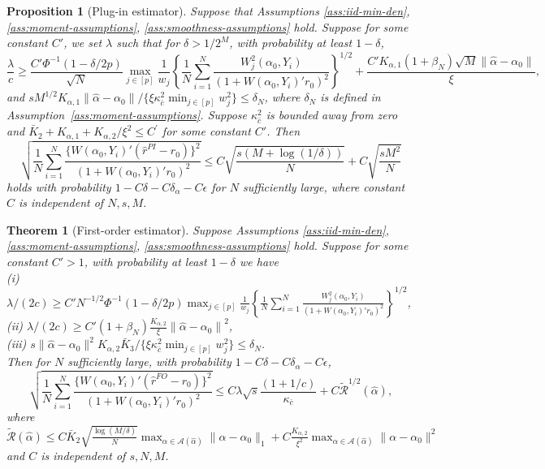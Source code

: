 \documentclass[10pt,a4paper]{amsart}
\newtheorem{proposition}{Proposition}
\newtheorem{theorem}{Theorem}
\newcommand{\norm}[1]{\left\lVert #1 \right\rVert}
\begin{document}
\begin{proposition}[Plug-in estimator]\label{prop:plug-in:no-covariate}
Suppose that Assumptions \ref{ass:iid-min-den}, \ref{ass:moment-assumptions}, \ref{ass:smoothness-assumptions} hold. Suppose for some constant $C'$, we set $\lambda$ such that for $\delta>1/2^M$, with probability at least $1-\delta$, 
$$\frac{\lambda}{c}\geq\frac{C'\Phi^{-1}(1-\delta/2p)}{\sqrt{N}}\max_{j\in[p]} \frac{1}{w_j}\left\{\frac{1}{N}\sum_{i=1}^N \frac{W_j^2(\alpha_0,Y_i)}{(1+W(\alpha_0,Y_i)'r_0)^2}\right\}^{1/2}\!\!\!\!+\frac{C'K_{\alpha,1}(1+\beta_N)\sqrt{M}\|\hat\alpha-\alpha_0\|}{\xi},$$
and $sM^{1/2}K_{\alpha,1}\|\hat\alpha-\alpha_0\|/ \{\xi\kappa_{\bar c}^2\min_{j\in[p]}w_j^2\}\leq \delta_N$, where $\delta_N$ is defined in Assumption~\ref{ass:moment-assumptions}. Suppose $\kappa_{\bar{c}}^2$ is bounded away from zero and $\bar K_2 + K_{\alpha,1} + K_{\alpha,2}/\xi^2 \leq C^\prime$ for some constant $C'$. Then $$\displaystyle\sqrt{\frac{1}{N}\sum_{i=1}^N \frac{\{W(\alpha_0,Y_i)'(\hat r^{PI} - r_0 )\}^2}{(1+W(\alpha_0,Y_i)'r_0)^2}}\leq C\sqrt{\frac{s(M+\log(1/\delta))}{N}} + C\sqrt{\frac{sM^2}{N}}$$ 
holds with probability $1-C\delta-C\delta_\alpha-C\epsilon$ for $N$ sufficiently large, where constant $C$ is independent of $N,s,M$.
\end{proposition}

\begin{theorem}[First-order estimator]\label{thm:main:FO}
Suppose Assumptions \ref{ass:iid-min-den}, \ref{ass:moment-assumptions}, \ref{ass:smoothness-assumptions} hold. Suppose for some constant $C'>1$, with probability at least $1-\delta$ we have\\
(i) $\lambda/(2c) \geq C'N^{-1/2} \Phi^{-1}(1-\delta/2p)\max_{j\in[p]} \frac{1}{w_j}\left\{\frac{1}{N}\sum_{i=1}^N \frac{W_j^2(\alpha_0,Y_i)}{(1+W(\alpha_0,Y_i)'r_0)^2}\right\}^{1/2}$, \\
(ii) $\lambda/(2c) \geq C'(1+\beta_N)\frac{K_{\alpha,2}}{\xi}\norm{\hat{\alpha}-\alpha_0}^2$,\\
(iii) $s\|\hat\alpha-\alpha_0\|^2 K_{\alpha,2} \bar K_3 / \{\xi\kappa_{\bar c}^2 {\displaystyle \min_{j\in[p]}} w_j^2\}\leq \delta_N$. \\
Then for $N$ sufficiently large, with probability $1- C\delta - C\delta_\alpha-C\epsilon$, $$\displaystyle\sqrt{\frac{1}{N}\sum_{i=1}^N \frac{\{W(\alpha_0,Y_i)'(\hat r^{FO} - r_0 )\}^2}{(1+W(\alpha_0,Y_i)'r_0)^2}}\leq C\lambda\sqrt{s}\frac{(1+1/c)}{\kappa_{\bar{c}}}+C\widetilde{\mathcal{R}}^{1/2}(\hat\alpha),$$ 
where $\widetilde{\mathcal{R}}(\hat\alpha) \leq C\bar{K}_2\sqrt{\frac{\log (M/\delta)}{N}}{\displaystyle\max_{\alpha \in \mathcal{A}(\hat\alpha)}}\|\alpha-\alpha_0\|_1  + C\frac{K_{\alpha,2}}{\xi^2}{\displaystyle\max_{\alpha \in \mathcal{A}(\hat\alpha)}}\|\alpha - \alpha_0\|^2$ and $C$ is independent of $s,N,M$.
\end{theorem}
\end{document}
